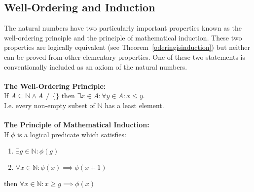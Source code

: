 \documentclass[12pt]{extarticle}
\newcommand{\N}{\mathbb{N}}
\begin{document}
\subsection{Well-Ordering and Induction}
The natural numbers have two particularly important properties known as the well-ordering principle and the principle of mathematical induction. These two properties are logically equivalent (see Theorem~\ref{oderingisinduction}) but neither can be proved from other elementary properties. One of these two statements is conventionally included as an axiom of the natural numbers. 
\\\\
\textbf{The Well-Ordering Principle:}\\
\indent If $A \subseteq \N \wedge A \neq \{\}$ then $\exists x \in A : \forall y \in A : x \le y$.\\
\indent I.e. every non-empty subset of $\N$ has a least element. 
\\\\
\textbf{The Principle of Mathematical Induction:}\\
\indent If $\phi$ is a logical predicate which satisfies: 
\begin{enumerate}
\item $\exists g \in \N : \phi (g)$
\item $\forall x \in \N : \phi (x) \implies \phi (x+1)$
\end{enumerate}

\quad then $\forall x \in \N : x \ge g \implies \phi (x)$
\newpage
\end{document}
